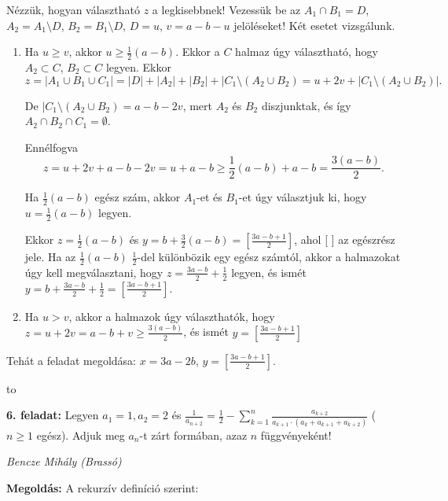 \documentclass[a4paper,10pt]{article}
\newcommand{\ki}[2]{\hfill {\it #1 (#2)}\medskip}
\newcommand{\vonal}{\hbox to \hsize{\hskip2truecm\hrulefill\hskip2truecm}}
\begin{document}
Nézzük, hogyan választható $z$ a legkisebbnek! Vezessük be 
az $A_1 \cap  B_1 = D$, $A_2 = A_1 \setminus  D$,
$B_2 = B_1 \setminus  D$, $D = u$, $v = a-b-u$ jelöléseket! Két esetet vizsgálunk.

\begin{enumerate}
\item Ha $u \ge  v$, akkor 
$u \ge \frac 12(a-b)$. Ekkor a $C$ halmaz úgy választható, hogy 
$A_2 \subset  C$, $B_2 \subset C$ legyen. Ekkor
\begin{equation}\label{eq:e53}
z = |A_1 \cup  B_1 \cup  C_1| = 
|D|+|A_2|+|B_2|+|C_1 \setminus \left(A_2 \cup  B_2\right) 
= u+2v+|C_1 \setminus  \left(A_2 \cup  B_2\right)|.
\end{equation}

De $|C_1 \setminus \left(A_2 \cup  B_2\right) 
= a-b-2v$, mert $A_2$ és $B_2$ diszjunktak, 
és így $A_2 \cap  B_2 \cap  C_1 = \emptyset$.

Ennélfogva
$$
z = u+2v+a-b-2v = u+a-b \ge \frac 12 (a-b)+a-b 
= \frac{3(a-b)}{2}.
$$

Ha $\frac 12(a-b)$ egész szám, 
akkor $A_1$-et és $B_1$-et úgy választjuk ki, hogy 
$u=\frac 12(a-b)$ legyen.

Ekkor $z = \frac 12(a-b)$ és 
$y = b+\frac 32(a-b)=
\left[\frac{3a-b+1}{2}\right]
$, 
ahol [ ] az egészrész jele. Ha az
$\frac 12(a-b)$ $\frac 12$-del különbözik egy egész számtól, akkor a halmazokat úgy kell megválasztani,
hogy 
$
z = \frac{3a-b}{2}+\frac{1}{2}$
legyen, és ismét 
$y=b+\frac{3a-b}{2}+\frac{1}{2}
=
\left[
\frac{3a-b+1}{2}
\right]$.

\item Ha $u > v$, akkor a halmazok úgy választhatók, 
hogy $z = u+2v = a-b+v \ge \frac{3(a-b)}{2}$, és
ismét $y = \left[\frac{3a-b+1}{2}\right]$
\end{enumerate}



Tehát a feladat megoldása: $x = 3a-2b$, $y =\left[\frac{3a-b+1}{2}\right]$.

\medskip

\vonal


{\bf 6. feladat: } Legyen $a_1=1, a_2=2$ és
$\displaystyle{\frac{1}{a_{n+2}}
=\frac{1}{2}-\sum_{k=1}^{n}\frac{a_{k+2}}{a_{k+1}\cdot(a_k+a_{k+1}+a_{k+2})}}$
($n \ge 1$ egész). 
Adjuk meg $a_n$-t zárt formában, azaz $n$ függvényeként!

\ki{Bencze Mihály}{Brassó}\medskip

{\bf Megoldás: } A rekurzív definíció szerint:
\end{document}
